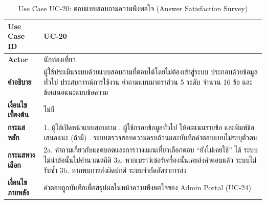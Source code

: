 \begin{table}[H]
\centering
\caption{Use Case UC-20: ตอบแบบสอบถามความพึงพอใจ (Answer Satisfaction Survey)}
\label{tab:uc20}
\begin{tabular}{|p{3.2cm}|p{10cm}|}
\hline
\textbf{Use Case ID} & UC-20 \\ \hline
\textbf{Actor} & นักท่องเที่ยว \\ \hline
\textbf{คำอธิบาย} & ผู้ใช้ประเมินระบบด้วยแบบสอบถามที่ตอบได้โดยไม่ต้องเข้าสู่ระบบ ประกอบด้วยข้อมูลทั่วไป ประสบการณ์การใช้งาน คำถามแบบมาตราส่วน 5 ระดับ จำนวน 16 ข้อ และข้อเสนอแนะแบบข้อความ \\ \hline
\textbf{เงื่อนไขเบื้องต้น} & ไม่มี \\ \hline
\textbf{กระแสหลัก} & 1. ผู้ใช้เปิดหน้าแบบสอบถาม \newline 2. ผู้ใช้กรอกข้อมูลทั่วไป ให้คะแนนรายข้อ และพิมพ์ข้อเสนอแนะ (ถ้ามี) \newline 3. ระบบตรวจสอบความครบถ้วนและบันทึกคำตอบแบบไม่ระบุตัวตน \\ \hline
\textbf{กระแสทางเลือก} & 2a. คำถามเกี่ยวกับแชตบอตและการวางแผนเที่ยวเลือกตอบ ``ยังไม่เคยใช้'' ได้ ระบบไม่นำข้อนั้นไปคำนวณสถิติ \newline 3a. หากเบราว์เซอร์เครื่องนั้นเคยส่งคำตอบแล้ว ระบบไม่รับซ้ำ \newline 3b. หากพบการส่งผิดปกติ ระบบจำกัดอัตราการส่ง \\ \hline
\textbf{เงื่อนไขภายหลัง} & คำตอบถูกบันทึกเพื่อสรุปผลในหน้าความพึงพอใจของ Admin Portal (UC-24) \\
\hline
\end{tabular}
\end{table}

